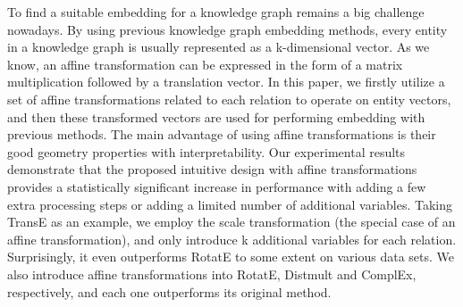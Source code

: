 To find a suitable embedding for a knowledge graph remains a big challenge nowadays. By using previous knowledge graph embedding methods, every entity in a knowledge graph is usually represented as a k-dimensional vector. As we know, an affine transformation can be expressed in the form of a matrix multiplication followed by a translation vector. In this paper, we firstly utilize a set of affine transformations related to each relation to operate on entity vectors, and then these transformed vectors are used for performing embedding with previous methods. The main advantage of using affine transformations is their good geometry properties with interpretability. Our experimental results demonstrate that the proposed intuitive design with affine transformations provides a statistically significant increase in performance with adding a few extra processing steps or adding a limited number of additional variables. Taking TransE as an example, we employ the scale transformation (the special case of an affine transformation), and only introduce k additional variables for each relation. Surprisingly, it even outperforms RotatE to some extent on various data sets. We also introduce affine transformations into RotatE, Distmult and ComplEx, respectively, and each one outperforms its original method.
